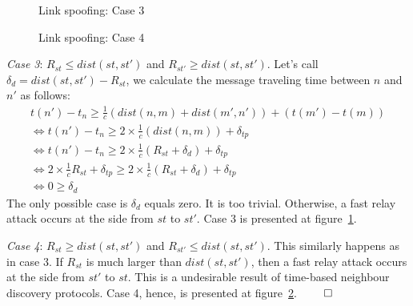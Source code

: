 \begin{figure}
	\caption{Link spoofing: Case 3} \label{chap3case3}
	\centering
\end{figure}
		
\begin{figure}
    \caption{Link spoofing: Case 4} \label{chap3case4} 
    \centering

\end{figure}

\emph{Case 3}: $R_{st} \le dist(st,st')$ and $R_{st'} \ge dist(st,st')$. Let's call $\delta_d = dist(st,st') - R_{st}$, we calculate the message traveling time between $n$ and $n'$ as follows: 
\begin{equation*}
\begin{split}
		t(n') - t_n \ge \frac 1 {c}(dist(n,m) + dist(m', n')) + (t(m') - t(m)) \\ \Leftrightarrow
		t(n') - t_n \ge 2 \times \frac 1 {c}(dist(n,m)) + \delta_{tp}\\ \Leftrightarrow
		t(n') - t_n \ge 2 \times \frac 1 {c} (R_{st} + \delta_d) + \delta_{tp} \\ \Leftrightarrow
		2 \times \frac 1 {c} R_{st} + \delta_{tp} \ge 2 \times \frac 1 {c} (R_{st} + \delta_d ) + \delta_{tp} \\ \Leftrightarrow
		0 \ge \delta_{d} 
\end{split}
\end{equation*}
The only possible case is $\delta_{d}$ equals zero. It is too trivial. Otherwise, a fast relay attack occurs at the side from $st$ to $st'$. Case 3 is presented at figure~\ref{chap3case3}.

\emph{Case 4}: $R_{st} \ge dist(st,st')$ and $R_{st'} \le dist(st,st')$. This similarly happens as in case 3. If $R_{st}$ is much larger than $dist(st,st')$, then a fast relay attack occurs at the side from $st'$ to $st$. This is a undesirable result of time-based neighbour discovery protocols. Case 4, hence, is presented at figure~\ref{chap3case4}. $\qed$

